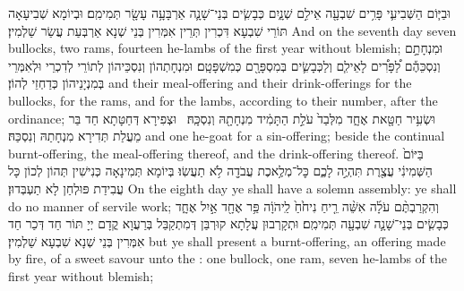 {וּבַיּ֧וֹם הַשְּׁבִיעִ֛י פָּרִ֥ים שִׁבְעָ֖ה אֵילִ֣ם שְׁנָ֑יִם כְּבָשִׂ֧ים בְּנֵי־שָׁנָ֛ה אַרְבָּעָ֥ה עָשָׂ֖ר תְּמִימִֽם׃}
{וּבְיוֹמָא שְׁבִיעָאָה תּוֹרֵי שִׁבְעָא דִּכְרִין תְּרֵין אִמְּרִין בְּנֵי שְׁנָא אַרְבְּעַת עֲשַׂר שַׁלְמִין׃}
{And on the seventh day seven bullocks, two rams, fourteen he-lambs of the first year without blemish;}{}
{וּמִנְחָתָ֣ם וְנִסְכֵּהֶ֡ם לַ֠פָּרִ֠ים לָאֵילִ֧ם וְלַכְּבָשִׂ֛ים בְּמִסְפָּרָ֖ם כְּמִשְׁפָּטָֽם׃}
{וּמִנְחָתְהוֹן וְנִסְכֵּיהוֹן לְתוֹרֵי לְדִכְרֵי וּלְאִמְּרֵי בְּמִנְיָנֵיהוֹן כְּדַחְזֵי לְהוֹן׃}
{and their meal-offering and their drink-offerings for the bullocks, for the rams, and for the lambs, according to their number, after the ordinance;}{}
{וּשְׂעִ֥יר חַטָּ֖את אֶחָ֑ד מִלְּבַד֙ עֹלַ֣ת הַתָּמִ֔יד מִנְחָתָ֖הּ וְנִסְכָּֽהּ׃ \setuma }
{וּצְפִירָא דְּחַטָּתָא חַד בַּר מֵעֲלַת תְּדִירָא מִנְחָתַהּ וְנִסְכַּהּ׃}
{and one he-goat for a sin-offering; beside the continual burnt-offering, the meal-offering thereof, and the drink-offering thereof.}{}
{בַּיּוֹם֙ הַשְּׁמִינִ֔י עֲצֶ֖רֶת תִּהְיֶ֣ה לָכֶ֑ם כׇּל־מְלֶ֥אכֶת עֲבֹדָ֖ה לֹ֥א תַעֲשֽׂוּ׃
}
{בְּיוֹמָא תְּמִינָאָה כְּנִישִׁין תְּהוֹן לְכוֹן כָּל עֲבִידַת פּוּלְחַן לָא תַעְבְּדוּן׃}
{On the eighth day ye shall have a solemn assembly: ye shall do no manner of servile work;}{}
{וְהִקְרַבְתֶּ֨ם עֹלָ֜ה אִשֵּׁ֨ה רֵ֤יחַ נִיחֹ֙חַ֙ לַֽיהֹוָ֔ה פַּ֥ר אֶחָ֖ד אַ֣יִל אֶחָ֑ד כְּבָשִׂ֧ים בְּנֵי־שָׁנָ֛ה שִׁבְעָ֖ה תְּמִימִֽם׃
}
{וּתְקָרְבוּן עֲלָתָא קוּרְבַּן דְּמִתְקַבַּל בְּרַעֲוָא קֳדָם יְיָ תּוֹר חַד דְּכַר חַד אִמְּרִין בְּנֵי שְׁנָא שִׁבְעָא שַׁלְמִין׃}
{but ye shall present a burnt-offering, an offering made by fire, of a sweet savour unto the \lord: one bullock, one ram, seven he-lambs of the first year without blemish;}{}
